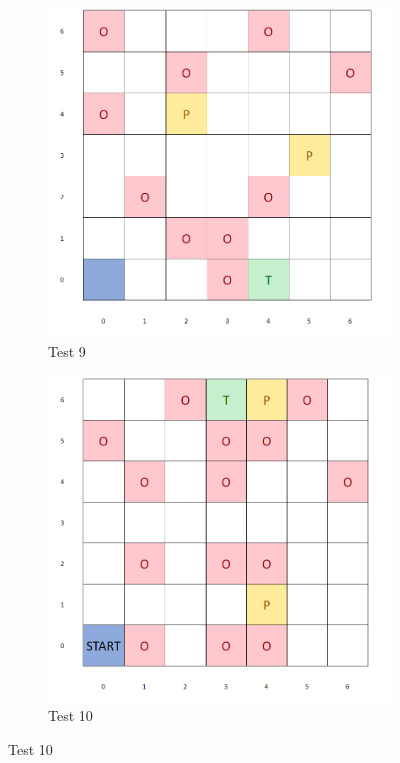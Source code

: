 \documentclass{article}
\begin{document}
\begin{appendices}
\begin{figure}[H]
   	 \centering
     \begin{subfigure}[b]{0.45\textwidth}
         \centering
         \includegraphics[width=\textwidth]{images/test9.png}
         \caption{Test 9}
         \label{fig:test19}
     \end{subfigure}
     \hfill
     \begin{subfigure}[b]{0.45\textwidth}
         \centering
         \includegraphics[width=\textwidth]{images/test10.png}
         \caption{Test 10}
         \label{fig:test110}
     \end{subfigure}
\end{figure}


\end{appendices}
\end{document}
